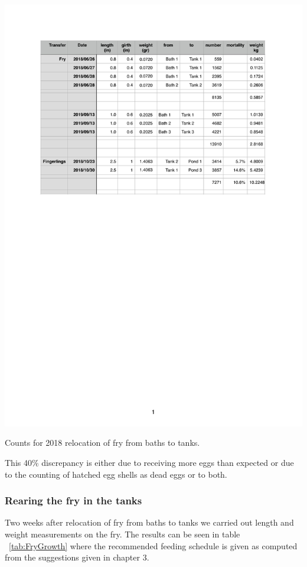 \begin{table}[H]
  \centering
  \includegraphics[scale = 0.9]{tables/TablesFryRelocationRecord.pdf}
   \caption{Counts for 2018 relocation of fry from baths to tanks.}
  \label{tab:FryRelocation2018}
\end{table}

This 40\% discrepancy is either due to receiving more eggs than expected or due to the
counting of hatched egg shells as dead eggs or to both.

\subsubsection{Rearing the fry in the tanks}
Two weeks after relocation of fry from baths to tanks we carried out length and weight measurements
on the fry. The results can be seen in table ~\ref{tab:FryGrowth} where the recommended feeding
schedule is given as computed from the suggestions given in chapter 3.

